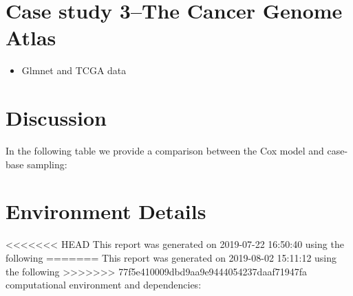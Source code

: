 \documentclass[
]{jss}
\providecommand{\tightlist}{%
  \setlength{\itemsep}{0pt}\setlength{\parskip}{0pt}}
\begin{document}
\hypertarget{case-study-3the-cancer-genome-atlas}{%
\section{Case study 3--The Cancer Genome
Atlas}\label{case-study-3the-cancer-genome-atlas}}

\begin{itemize}
\tightlist
\item
  Glmnet and TCGA data
\end{itemize}

\hypertarget{discussion}{%
\section{Discussion}\label{discussion}}

In the following table we provide a comparison between the Cox model and
case-base sampling:

\hypertarget{environment-details}{%
\section{Environment Details}\label{environment-details}}

<<<<<<< HEAD
This report was generated on 2019-07-22 16:50:40 using the following
=======
This report was generated on 2019-08-02 15:11:12 using the following
>>>>>>> 77f5e410009dbd9aa9e9444054237daaf71947fa
computational environment and dependencies:
\end{document}

